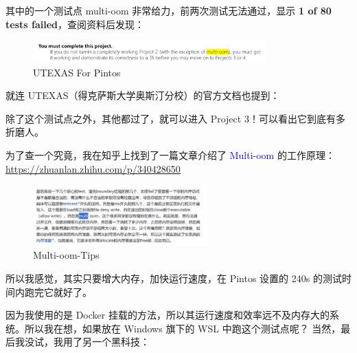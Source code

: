 \documentclass[14pt,a4paper,UTF8,twoside]{article}
\renewcommand{\texttt}[1]{\textcolor{blue}{\ttfamily #1}}
\begin{document}
其中的一个测试点 multi-oom 非常给力，前两次测试无法通过，显示 \textbf{1 of 80 tests failed}，查阅资料后发现：

\begin{figure}[H]
    \centering
    \includegraphics[width=0.8\textwidth]{img6/multioom.png}
    \caption{UTEXAS For Pintos}
    \label{fig:multi_oom}
\end{figure}

就连 UTEXAS（得克萨斯大学奥斯汀分校）的官方文档也提到：

\begin{mdframed}
    除了这个测试点之外，其他都过了，就可以进入 Project 3！可以看出它到底有多折磨人。
\end{mdframed}

为了查一个究竟，我在知乎上找到了一篇文章介绍了 \texttt{Multi-oom} 的工作原理：\href{https://zhuanlan.zhihu.com/p/340428650}{\underline{https://zhuanlan.zhihu.com/p/340428650}}

\begin{figure}[H]
    \centering
    \includegraphics[width=0.6\textwidth]{img6/multioomtip.png}
    \caption{Multi-oom-Tips}
    \label{fig:multi_oom_work}
\end{figure}

所以我感觉，其实只要增大内存，加快运行速度，在 Pintos 设置的 240s 的测试时间内跑完它就好了。

因为我使用的是 Docker 挂载的方法，所以其运行速度和效率远不及内存大的系统。所以我在想，如果放在 Windows 旗下的 WSL 中跑这个测试点呢？
当然，最后我没试，我用了另一个黑科技：
\end{document}
